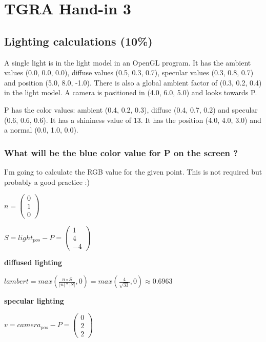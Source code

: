 \section{TGRA Hand-in 3}

\subsection{Lighting calculations (10\%)}
A single light is in the light model in an OpenGL program. It has the ambient values (0.0, 0.0, 0.0), diffuse values (0.5, 0.3, 0.7), specular values (0.3, 0.8, 0.7) and position (5.0, 8.0, -1.0). There is also a global ambient factor of (0.3, 0.2, 0.4) in the light model. A camera is positioned in (4.0, 6.0, 5.0) and looks towards P.

P has the color values: ambient (0.4, 0.2, 0.3), diffuse (0.4, 0.7, 0.2) and specular (0.6, 0.6, 0.6). It has a shininess value of 13. It has the position (4.0, 4.0, 3.0) and a normal (0.0, 1.0, 0.0).

\subsubsection{What will be the blue color value for P on the screen ?}
I'm going to calculate the RGB value for the given point. This is not required but probably a good practice :)

$
    n
=
    \left(\begin{array}{c}
        0\\
        1\\
        0
    \end{array}\right)
$

$
    S
=
    light_{pos}
    -
    P
=
    \left(\begin{array}{c}
        1\\
        4\\
        -4
    \end{array}\right)
$

\textbf{diffused lighting}

$
    lambert
=
    max\left(
        \frac{
            n
            \circ
            S
        }{
            | n | * | S |
        }
        , 
        0
    \right)
=
    max\left(
        \frac{4}{\sqrt{33}}
        ,
        0
    \right)
\approx
    0.6963
$

\textbf{specular lighting}

$
    v
=
    camera_{pos}
    -
    P
=
    \left(\begin{array}{c}
        0\\
        2\\
        2
    \end{array}\right)
$

